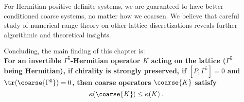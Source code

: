 For Hermitian positive definite systems, we are guaranteed to have better conditioned coarse systems, no matter how we coarsen.
We believe that careful study of numerical range theory on other lattice discretizations reveals further algorithmic and theoretical insights.

Concluding, the main finding of this chapter is:\\
\textbf{
For an invertible $\Gamma^{5}$-Hermitian operator $K$ acting on the lattice ($\Gamma^{5}$ being Hermitian),
if chirality is strongly preserved, \ie if $[P, \Gamma^{5}] = 0$ and $\tr(\coarse{\Gamma^5}) = 0$, then coarse operators $\coarse{K}$ satisfy
\begin{equation}
\kappa(\coarse{K}) \leq \kappa(K) \;.
\end{equation}
}
